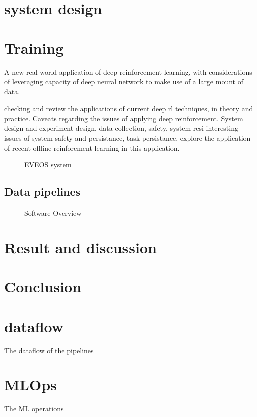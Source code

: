 \documentclass{article}
\begin{document}
\section{system design}
\label{sec:design}

\section{Training}



A new real world application of deep reinforcement learning, with considerations of leveraging capacity of deep neural network to make use of a large mount of data.

checking and review the applications of current deep rl techniques, in theory and practice. Caveats regarding the issues of applying deep reinforcement. System design and experiment design, data collection, safety, system resi
interesting issues of system safety and persistance, task persistance.
explore the application of recent offline-reinforcment learning in this application.



\begin{figure}[ht]
	\centering
	\def\svgwidth{\columnwidth}
	
	\caption{\label{fig:veos} EVEOS system}
\end{figure}


\subsection{Data pipelines}

\begin{figure}[ht]
	\centering
	\def\svgwidth{\columnwidth}
	
	\caption{\label{fig:label} Software Overview}
\end{figure}


\section{Result and discussion}
\label{sec:result}


\section{Conclusion}
\label{sec:conclusion}

\begin{appendices}
	\section{dataflow}
	The dataflow of the pipelines
	\section{MLOps}
	The ML operations
\end{appendices}
%
%
\end{document}

